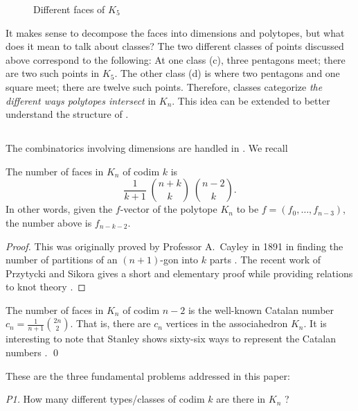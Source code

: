 \documentclass[10pt]{amsart}
\begin{document}
\begin{figure} [h]
\caption{Different faces of $K_5$}
\label{types}
\end{figure}

It makes sense to decompose the faces into dimensions and polytopes, but what does it mean to talk about classes?  The two different classes of points discussed above correspond to the following:  At one class (c), three pentagons meet; there are two such points in $K_5$.  The other class (d) is where two pentagons and one square meet; there are twelve such points.  Therefore, classes categorize {\em the different ways polytopes intersect} in $K_n$. This idea can be extended to better understand the structure of .


\subsection{}
The combinatorics involving dimensions are handled in \cite{dev}.  We recall

\begin{lem}
The number of faces in $K_n$ of codim $k$ is $$\frac{1}{k+1} \; \binom{n+k}{k} \; \binom{n-2}{k}.$$ 
In other words, given the $f$-vector of the polytope $K_n$ to be $f=(f_0, \ldots, f_{n-3})$, the number above is $f_{n-k-2}$.
\label{l:cayley}
\end{lem}

\begin{proof}
This was originally proved by Professor A.\ Cayley in 1891 in finding the number of partitions of an $(n+1)$-gon into $k$ parts  \cite{cay}. The recent work of Przytycki and Sikora gives a short and elementary proof while providing relations to knot theory \cite{ps}. 
\end{proof}

\begin{rem}
The number of faces in $K_n$ of codim $n-2$ is the well-known Catalan number $c_n = \frac{1}{n+1} \binom{2n}{2}$.  That is, there are $c_n$ vertices in the associahedron $K_n$.  It is interesting to note that Stanley shows sixty-six ways to represent the Catalan numbers \cite[Exercise 6.19]{s2}.
\qed
\end{rem}

\noindent These are the three fundamental problems addressed in this paper:
\vspace{.1in}

{\em P1.}     How many different types/classes  of codim $k$ are there in $K_n$ ?
\vspace{.03in}
\end{document}
